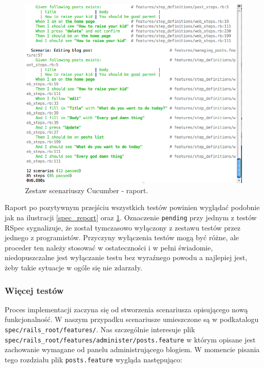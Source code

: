   	\begin{figure}[!h]
  		\begin{center}
  			\includegraphics[width=\linewidth]{images/features_report.png}
  			\caption{Zestaw scenariuszy Cucumber - raport.}
  			\label{features_report}
  		\end{center}
  	\end{figure}
  	
  	  Raport po pozytywnym przejściu wszystkich testów powinien wyglądać podobnie jak na ilustracji \ref{spec_report} oraz \ref{features_report}. Oznaczenie \texttt{pending} przy jednym z testów RSpec sygnalizuje, że został tymczasowo wyłączony z zestawu testów przez jednego z programistów. Przyczyny wyłączenia testów mogą być różne, ale proceder ten należy stosować w ostateczności i w pełni świadomie, niedopuszczalne jest wyłączanie testu bez wyraźnego powodu a najlepiej jest, żeby takie sytuacje w ogóle się nie zdarzały.
  	  
  	\subsubsection{Więcej testów}
  	  Proces implementacji zaczyna się od stworzenia scenariusza opisującego nową funkcjonalność. W naszym przypadku scenariusze umieszczone są w podkatalogu \texttt{spec/rails\_root/features/}. Nas szczególnie interesuje plik \texttt{spec/rails\_root/features/administer/posts.feature} w którym opisane jest zachowanie wymagane od panelu administrującego blogiem. W momencie pisania tego rozdziału plik \texttt{posts.feature} wygląda następująco:
  	  
